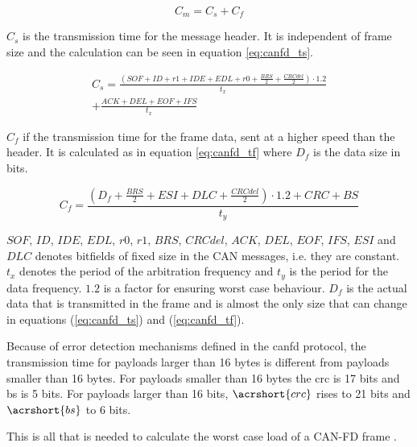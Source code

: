 \begin{equation}
    C_m=C_s+C_f
    \label{eq:canfd_cm}
\end{equation}

$C_s$ is the transmission time for the message header. It is independent of frame size and the calculation can be seen in equation \ref{eq:canfd_ts}.

\begin{equation}
    \begin{gathered}
        C_s=\frac{(SOF+ID+r1+IDE+EDL+r0+\frac{BRS}{2}+\frac{CRCdel}{2})\cdot1.2}{t_x}\\+\frac{ACK+DEL+EOF+IFS}{t_x}
    \end{gathered}
    \label{eq:canfd_ts}
\end{equation}

$C_f$ if the transmission time for the frame data, sent at a higher speed than the header. It is calculated as in equation \ref{eq:canfd_tf} where $D_f$ is the data size in bits.

\begin{equation}
    C_f=\frac{(D_f+\frac{BRS}{2}+ESI+DLC+\frac{CRCdel}{2})\cdot1.2+CRC+BS}{t_y}
    \label{eq:canfd_tf}
\end{equation}

$SOF$, $ID$, $IDE$, $EDL$, $r0$, $r1$, $BRS$, $CRCdel$, $ACK$, $DEL$, $EOF$, $IFS$, $ESI$ and $DLC$ denotes bitfields of fixed size in the CAN messages, i.e. they are constant. $t_x$ denotes the period of the arbitration frequency and $t_y$ is the period for the data frequency. $1.2$ is a factor for ensuring worst case behaviour. $D_f$ is the actual data that is transmitted in the frame and is almost the only size that can change in equations (\ref{eq:canfd_ts}) and (\ref{eq:canfd_tf}).

Because of error detection mechanisms defined in the \acrshort{canfd} protocol, the transmission time for payloads larger than 16 bytes is different from payloads smaller than 16 bytes. For payloads smaller than 16 bytes the \acrfull{crc} is 17 bits and \acrfull{bs} is 5 bits. For payloads larger than 16 bits, $\acrshort{crc}$ rises to 21 bits and $\acrshort{bs}$ to 6 bits.

This is all that is needed to calculate the worst case load of a CAN-FD frame \cite{canfd}.




